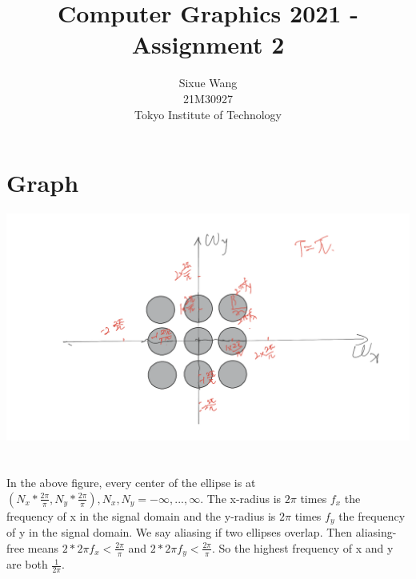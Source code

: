 \documentclass{article}
\title{Computer Graphics 2021 - Assignment 2}
\author{Sixue Wang\\21M30927\\Tokyo Institute of Technology}
\begin{document}
\maketitle

\section{Graph}
\includegraphics[width=\textwidth]{h2_1.png}

\section{}
In the above figure, every center of the ellipse is at $(N_x*\frac{2\pi}{\pi}, N_y*\frac{2\pi}{\pi}), N_x,N_y=-\infty,...,\infty$. The x-radius is $2\pi$ times $f_x$ the frequency of x in the signal domain and the y-radius is $2\pi$ times $f_y$ the frequency of y in the signal domain. We say aliasing if two ellipses overlap. Then aliasing-free means $2*2\pi f_x < \frac{2\pi}{\pi}$ and $2*2\pi f_y < \frac{2\pi}{\pi}$. So the highest frequency of x and y are both $\frac{1}{2\pi}$.
\end{document}
